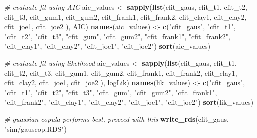 \documentclass[12pt, twoside]{amherstthesis}
\newenvironment{Shaded}{\begin{snugshade}}{\end{snugshade}}
\newcommand{\CommentTok}[1]{\textcolor[rgb]{0.56,0.35,0.01}{\textit{#1}}}
\newcommand{\FunctionTok}[1]{\textcolor[rgb]{0.13,0.29,0.53}{\textbf{#1}}}
\newcommand{\NormalTok}[1]{#1}
\newcommand{\OtherTok}[1]{\textcolor[rgb]{0.56,0.35,0.01}{#1}}
\newcommand{\StringTok}[1]{\textcolor[rgb]{0.31,0.60,0.02}{#1}}
\begin{document}
\begin{Shaded}
\begin{Highlighting}[]
\CommentTok{\# evaluate fit using AIC}
\NormalTok{aic\_values }\OtherTok{\textless{}{-}} \FunctionTok{sapply}\NormalTok{(}\FunctionTok{list}\NormalTok{(cfit\_gaus, cfit\_t1, cfit\_t2, cfit\_t3, }
\NormalTok{                          cfit\_gum1, cfit\_gum2, cfit\_frank1, cfit\_frank2, }
\NormalTok{                          cfit\_clay1, cfit\_clay2, cfit\_joe1, cfit\_joe2}
\NormalTok{                          ), AIC)}
\FunctionTok{names}\NormalTok{(aic\_values) }\OtherTok{\textless{}{-}} \FunctionTok{c}\NormalTok{(}\StringTok{"cfit\_gaus"}\NormalTok{, }\StringTok{"cfit\_t1"}\NormalTok{, }\StringTok{"cfit\_t2"}\NormalTok{, }\StringTok{"cfit\_t3"}\NormalTok{,}
                       \StringTok{"cfit\_gum"}\NormalTok{, }\StringTok{"cfit\_gum2"}\NormalTok{, }\StringTok{"cfit\_frank1"}\NormalTok{, }\StringTok{"cfit\_frank2"}\NormalTok{, }
                       \StringTok{"cfit\_clay1"}\NormalTok{, }\StringTok{"cfit\_clay2"}\NormalTok{, }\StringTok{"cfit\_joe1"}\NormalTok{, }\StringTok{"cfit\_joe2"}\NormalTok{)}
\FunctionTok{sort}\NormalTok{(aic\_values)}

\CommentTok{\# evaluate fit using likelihood}
\NormalTok{aic\_values }\OtherTok{\textless{}{-}} \FunctionTok{sapply}\NormalTok{(}\FunctionTok{list}\NormalTok{(cfit\_gaus, cfit\_t1, cfit\_t2, cfit\_t3, }
\NormalTok{                          cfit\_gum1, cfit\_gum2, cfit\_frank1, cfit\_frank2, }
\NormalTok{                          cfit\_clay1, cfit\_clay2, cfit\_joe1, cfit\_joe2}
\NormalTok{                          ), logLik)}
\FunctionTok{names}\NormalTok{(lik\_values) }\OtherTok{\textless{}{-}} \FunctionTok{c}\NormalTok{(}\StringTok{"cfit\_gaus"}\NormalTok{, }\StringTok{"cfit\_t1"}\NormalTok{, }\StringTok{"cfit\_t2"}\NormalTok{, }\StringTok{"cfit\_t3"}\NormalTok{,}
                       \StringTok{"cfit\_gum"}\NormalTok{, }\StringTok{"cfit\_gum2"}\NormalTok{, }\StringTok{"cfit\_frank1"}\NormalTok{, }\StringTok{"cfit\_frank2"}\NormalTok{, }
                       \StringTok{"cfit\_clay1"}\NormalTok{, }\StringTok{"cfit\_clay2"}\NormalTok{, }\StringTok{"cfit\_joe1"}\NormalTok{, }\StringTok{"cfit\_joe2"}\NormalTok{)}
\FunctionTok{sort}\NormalTok{(lik\_values)}

\CommentTok{\# guassian copula performs best, proceed with this}
\FunctionTok{write\_rds}\NormalTok{(cfit\_gaus, }\StringTok{"sim/gauscop.RDS"}\NormalTok{)}
\end{Highlighting}
\end{Shaded}
\normalsize
\end{document}

